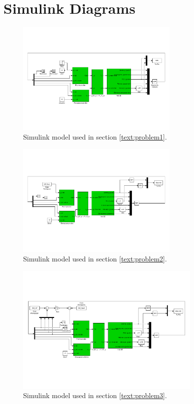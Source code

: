 \section{Simulink Diagrams}\label{text:simulink}
\begin{figure}[h]
	\centering
		\includegraphics[width = 0.70\textwidth]{figures/1/simulink.pdf}
	\caption{Simulink model used in section \ref{text:problem1}.}
\end{figure}
\begin{figure}[h]
	\centering
		\includegraphics[width = 0.70\textwidth]{figures/2/simulink.pdf}
	\caption{Simulink model used in section \ref{text:problem2}.}
\end{figure}

\begin{figure}[h]
	\centering
		\includegraphics[width = 0.80\textwidth]{figures/3/simulink.pdf}
	\caption{Simulink model used in section \ref{text:problem3}.}
\end{figure}

